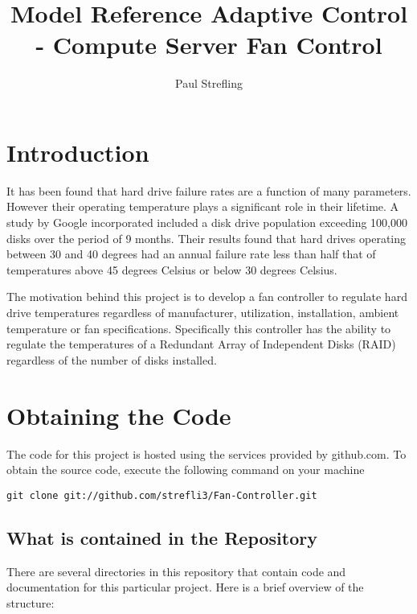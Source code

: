 \documentclass[10pt,letterpaper]{report}
\author{Paul Strefling}
\title{ Model Reference Adaptive Control - Compute Server Fan Control}
\begin{document}
\maketitle

\setcounter{secnumdepth}{5}
\setcounter{tocdepth}{5}

\tableofcontents

\section{Introduction}

It has been found that hard drive failure rates are a function of many parameters. However their operating temperature plays a significant role in their lifetime. A study by Google incorporated included a disk drive population exceeding 100,000 disks over the period of 9 months. Their results found that hard drives operating between 30 and 40 degrees had an annual failure rate less than half that of temperatures above 45 degrees Celsius or below 30 degrees Celsius.

The motivation behind this project is to develop a fan controller to regulate hard drive temperatures regardless of manufacturer, utilization, installation, ambient temperature or fan specifications. Specifically this controller has the ability to regulate the temperatures of a Redundant Array of Independent Disks (RAID) regardless of the number of disks installed.

\section{Obtaining the Code}

The code for this project is hosted using the services provided by github.com. To obtain the source code, execute the following command on your machine

\begin{verbatim}
git clone git://github.com/strefli3/Fan-Controller.git
\end{verbatim}


\subsection{What is contained in the Repository}

There are several directories in this repository that contain code and documentation for this particular project. Here is a brief overview of the structure:
\end{document}
